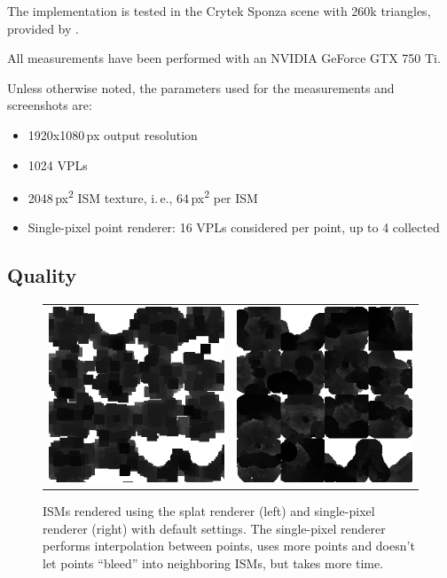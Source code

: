  The implementation is tested in the Crytek Sponza scene with 260k triangles, provided by \cite{McGuire2011Data}.

 All measurements have been performed with an NVIDIA GeForce GTX 750 Ti.


 Unless otherwise noted, the parameters used for the measurements and screenshots are:
 \vspace{-1em}
 \begin{itemize}
     \setlength\itemsep{0.0em}
     \item 1920x1080\,px output resolution
     \item 1024 VPLs
     \item 2048\,px\textsuperscript{2} ISM texture, i.\,e., 64\,px\textsuperscript{2} per ISM
     \item Single-pixel point renderer: 16 VPLs considered per point, up to 4 collected
 \end{itemize}




 \subsection{Quality}

 \begin{figure}[htb]
 \centering
   \begin{tabular}{@{}cc@{}}
     \includegraphics[width=.22\textwidth]{../screenshots/ism_splat_cropped} &
     \includegraphics[width=.22\textwidth]{../screenshots/ism_single_pixel_cropped}
   \end{tabular}
   \caption{ISMs rendered using the splat renderer (left) and single-pixel renderer (right) with default settings. The single-pixel renderer performs interpolation between points, uses more points and doesn't let points ``bleed'' into neighboring ISMs, but takes more time.}
   \label{fig:results:isms}
 \end{figure}

